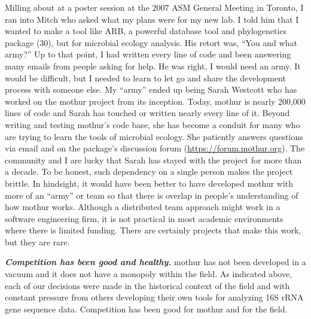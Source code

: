 \documentclass[11pt,]{article}
\begin{document}
Milling about at a poster session at the 2007 ASM General Meeting in
Toronto, I ran into Mitch who asked what my plans were for my new lab. I
told him that I wanted to make a tool like ARB, a powerful database tool
and phylogenetics package (30), but for microbial ecology analysis. His
retort was, ``You and what army?'' Up to that point, I had written every
line of code and been answering many emails from people asking for help.
He was right, I would need an army. It would be difficult, but I needed
to learn to let go and share the development process with someone else.
My ``army'' ended up being Sarah Westcott who has worked on the mothur
project from its inception. Today, mothur is nearly 200,000 lines of
code and Sarah has touched or written nearly every line of it. Beyond
writing and testing mothur's code base, she has become a conduit for
many who are trying to learn the tools of microbial ecology. She
patiently answers questions via email and on the package's discussion
forum (\url{https://forum.mothur.org}). The community and I are lucky
that Sarah has stayed with the project for more than a decade. To be
honest, such dependency on a single person makes the project brittle. In
hindsight, it would have been better to have developed mothur with more
of an ``army'' or team so that there is overlap in people's
understanding of how mothur works. Although a distributed team approach
might work in a software engineering firm, it is not practical in most
academic environments where there is limited funding. There are
certainly projects that make this work, but they are rare.

\textbf{\emph{Competition has been good and healthy.}} mothur has not
been developed in a vacuum and it does not have a monopoly within the
field. As indicated above, each of our decisions were made in the
historical context of the field and with constant pressure from others
developing their own tools for analyzing 16S rRNA gene sequence data.
Competition has been good for mothur and for the field.
\end{document}
